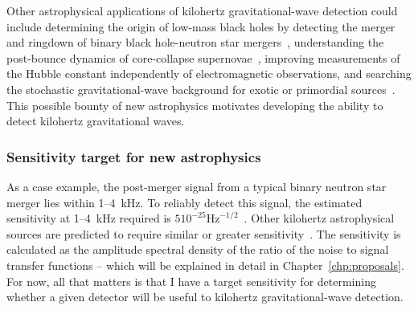 Other astrophysical applications of kilohertz gravitational-wave detection could include determining the origin of low-mass black holes by detecting the merger and ringdown of binary black hole-neutron star mergers~\cite{}, understanding the post-bounce dynamics of core-collapse supernovae~\cite{}, improving measurements of the Hubble constant independently of electromagnetic observations, and searching the stochastic gravitational-wave background for exotic or primordial sources~\cite{miaoDesignGravitationalWaveDetectors2018}.
This possible bounty of new astrophysics motivates developing the ability to detect kilohertz gravitational waves.



\subsubsection{Sensitivity target for new astrophysics}

As a case example, the post-merger signal from a typical binary neutron star merger lies within 1--4~kHz. To reliably detect this signal, the estimated sensitivity at 1--4~kHz required is $5 10^{-25} \mathrm{Hz}^{-1/2}$~\cite{miaoDesignGravitationalWaveDetectors2018}. 
Other kilohertz astrophysical sources are predicted to require similar or greater sensitivity~\cite{}. 
The sensitivity is calculated as the amplitude spectral density of the ratio of the noise to signal transfer functions -- which will be explained in detail in Chapter~\ref{chp:proposals}. For now, all that matters is that I have a target sensitivity for determining whether a given detector will be useful to kilohertz gravitational-wave detection.


